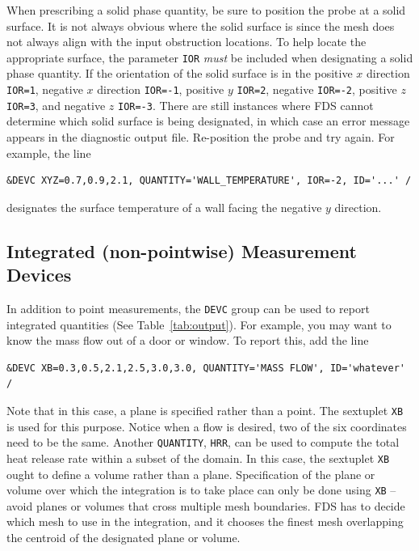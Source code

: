\documentclass[11pt]{book}
\newcommand{\ct}{\tt\small}
\begin{document}
When prescribing a solid phase quantity, be sure to position the
probe at a solid surface. It is not always obvious where the
solid surface is since the mesh does not always align with the input obstruction
locations. To help locate the appropriate surface, the parameter {\ct IOR} {\em must} be included
when designating a solid phase quantity.
If the orientation of the solid surface is in the
positive $x$ direction {\ct IOR=1}, negative $x$ direction {\ct IOR=-1},
positive $y$ {\ct IOR=2}, negative {\ct IOR=-2}, positive $z$ {\ct IOR=3},
and negative $z$ {\ct IOR=-3}. There are still instances where FDS cannot
determine which solid surface is being designated, in which case an
error message appears in the diagnostic output file.
Re-position the probe and try again. For example, the line

\footnotesize
\begin{verbatim}
&DEVC XYZ=0.7,0.9,2.1, QUANTITY='WALL_TEMPERATURE', IOR=-2, ID='...' /
\end{verbatim}
\normalsize

\noindent
designates the surface temperature of a wall facing the negative $y$
direction.



\subsection{Integrated (non-pointwise) Measurement Devices}
In addition to point measurements, the {\ct DEVC} group can be used
to report integrated quantities (See Table~\ref{tab:output}).
For example, you may want to know the mass flow out of a door or window.
To report this, add the line

\footnotesize
\begin{verbatim}
&DEVC XB=0.3,0.5,2.1,2.5,3.0,3.0, QUANTITY='MASS FLOW', ID='whatever' /
\end{verbatim}
\normalsize

\noindent
Note that in this case, a plane is specified rather than
a point. The sextuplet {\ct XB} is used for this purpose. Notice when a
flow is desired, two of the six coordinates need to be the same. Another
{\ct QUANTITY}, {\ct HRR}, can be used to compute the total heat release
rate within a subset of the domain. In this case, the sextuplet
{\ct XB} ought to define a volume rather than a plane. Specification of
the plane or volume over which the integration is to take place can only
be done using {\ct XB} -- avoid planes or volumes
that cross multiple mesh boundaries. FDS has to decide which mesh to
use in the integration, and it chooses the finest mesh overlapping
the centroid of the designated plane or volume.
\end{document}
